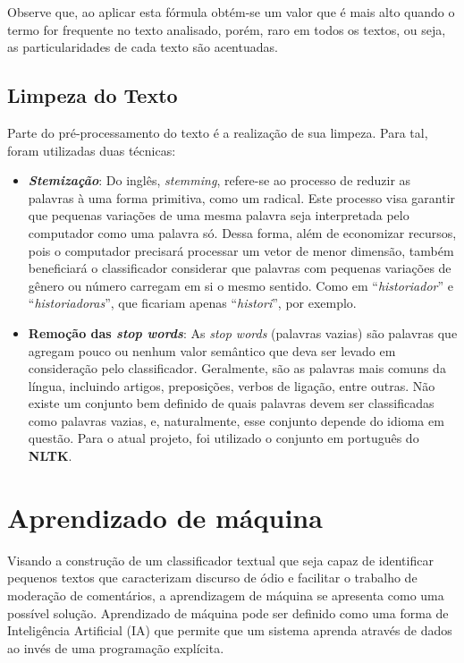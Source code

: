 Observe que, ao aplicar esta fórmula obtém-se um valor que é mais alto quando o termo for frequente no texto analisado, porém, raro em todos os textos, ou seja, as particularidades de cada texto são acentuadas.

\subsection{Limpeza do Texto}

Parte do pré-processamento do texto é a realização de sua limpeza. Para tal, foram utilizadas duas técnicas:

\begin{itemize}
\item \textbf{\textit{Stemização}}: Do inglês, \textit{stemming}, refere-se ao processo de reduzir as palavras à uma forma primitiva, como um radical. Este processo visa garantir que pequenas variações de uma mesma palavra seja interpretada pelo computador como uma palavra só. Dessa forma, além de economizar recursos, pois o computador precisará processar um vetor de menor dimensão, também beneficiará o classificador considerar que palavras com pequenas variações de gênero ou número carregam em si o mesmo sentido. Como em “\textit{historiador}” e “\textit{historiadoras}”, que ficariam apenas “\textit{histori}”, por exemplo.

\item \textbf{Remoção das \textit{stop words}}: As \textit{stop words} (palavras vazias) são palavras que agregam pouco ou nenhum valor semântico que deva ser levado em consideração pelo classificador. Geralmente, são as palavras mais comuns da língua, incluindo artigos, preposições, verbos de ligação, entre outras. Não existe um conjunto bem definido de quais palavras devem ser classificadas como palavras vazias, e, naturalmente, esse conjunto depende do idioma em questão. Para o atual projeto, foi utilizado o conjunto em português do \textbf{NLTK}.
\end{itemize}

\section{Aprendizado de máquina}

Visando a construção de um classificador textual que seja capaz de identificar pequenos textos que caracterizam discurso de ódio e facilitar o trabalho de moderação de comentários, a aprendizagem de máquina se apresenta como uma possível solução. Aprendizado de máquina pode ser definido como uma forma de Inteligência Artificial (IA) que permite que um sistema aprenda através de dados ao invés de uma programação explícita. \cite{mlfordummyes:2018}

